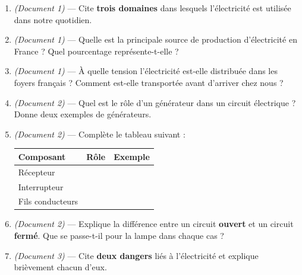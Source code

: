 \documentclass[11pt,a4paper]{article}
\newcommand{\cadreblanc}[1]{%
\medskip\framebox[\linewidth][c]{%
\rule{0mm}{#1mm}}\par
\medskip}
\renewcommand{\arraystretch}{1.8}
\begin{document}
\begin{enumerate}[label=\textbf{Q\arabic*.}, leftmargin=2cm, itemsep=6pt]

  \item \textit{(Document 1)} --- Cite \textbf{trois domaines} dans lesquels l'électricité est utilisée dans notre quotidien.

  \cadreblanc{25}

  \item \textit{(Document 1)} --- Quelle est la principale source de production d'électricité en France ? Quel pourcentage représente-t-elle ?

  \cadreblanc{22}

  \newpage
  \item \textit{(Document 1)} --- À quelle tension l'électricité est-elle distribuée dans les foyers français ? Comment est-elle transportée avant d'arriver chez nous ?

  \cadreblanc{22}

  \item \textit{(Document 2)} --- Quel est le rôle d'un générateur dans un circuit électrique ? Donne deux exemples de générateurs.

  \cadreblanc{22}

  \item \textit{(Document 2)} --- Complète le tableau suivant :

  \begin{center}
  \renewcommand{\arraystretch}{1}
  \begin{tabularx}{\linewidth}{|l|X|X|}
  \hline
  \textbf{Composant} & \textbf{Rôle} & \textbf{Exemple} \\[10pt]
  \hline
  Récepteur & & \\[28pt]
  \hline
  Interrupteur & & \\[28pt]
  \hline
  Fils conducteurs & & \\[28pt]
  \hline
  \end{tabularx}
  \end{center}

  \item \textit{(Document 2)} --- Explique la différence entre un circuit \textbf{ouvert} et un circuit \textbf{fermé}. Que se passe-t-il pour la lampe dans chaque cas ?

  \cadreblanc{28}

  \item \textit{(Document 3)} --- Cite \textbf{deux dangers} liés à l'électricité et explique brièvement chacun d'eux.


\end{enumerate}
\end{document}
